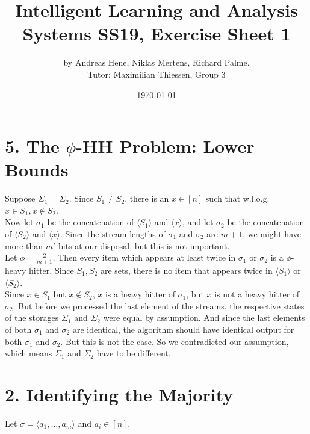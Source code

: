 \documentclass{article}
\begin{document}
\title{Intelligent Learning and Analysis Systems SS19, Exercise Sheet 1}
\author{by Andreas Hene, Niklas Mertens, Richard Palme.\\
Tutor: Maximilian Thiessen, Group 3}
\date{\today}
\maketitle

\section*{5. The $\phi$-HH Problem: Lower Bounds}
Suppose $\Sigma_1 = \Sigma_2$. Since $S_1 \neq S_2$, there is an $x \in [n]$
such that w.l.o.g. $x \in S_1, x \notin S_2$. \\

Now let $\sigma_1$ be the concatenation of $\langle S_1 \rangle$ and $\langle x \rangle$,
and let $\sigma_2$ be the concatenation of $\langle S_2 \rangle$ and $\langle x \rangle$.
Since the stream lengths of $\sigma_1$ and $\sigma_2$ are $m+1$, we might have more than $m'$ bits at our disposal, but this is not important. \\

Let $\phi = \frac{2}{m+1}$. Then every item which appears at least twice in $\sigma_1$ or $\sigma_2$ is a $\phi$-heavy hitter.
Since $S_1, S_2$ are sets, there is no item that appears twice in $\langle S_1 \rangle$ or $\langle S_2 \rangle$. \\

Since $x \in S_1$ but $x \notin S_2$, $x$ is a heavy hitter of $\sigma_1$, but $x$ is not a heavy hitter of $\sigma_2$.
But before we processed the last element of the streams, the respective states of the storages $\Sigma_1$ and $\Sigma_2$ were equal by assumption.
And since the last elements of both $\sigma_1$ and $\sigma_2$ are identical, the algorithm should have identical output for both $\sigma_1$ and $\sigma_2$. But this is not the case.
So we contradicted our assumption, which means $\Sigma_1$ and $\Sigma_2$ have to be different.


\newpage
\section*{2. Identifying the Majority}

Let $\sigma = \langle a_1, \hdots, a_m \rangle$ and $a_i \in [n]$. \\
\end{document}
